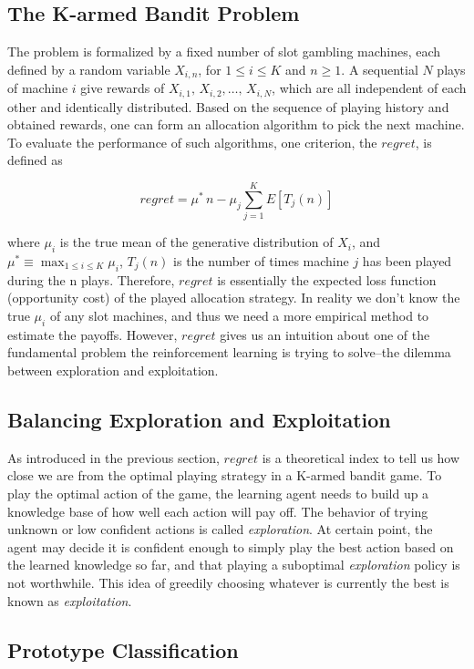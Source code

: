 \documentclass[conference]{IEEEtran}
\begin{document}
\subsection{The K-armed Bandit Problem}
The problem is formalized by a fixed number of slot gambling machines, each defined by a random variable $X_{i,n}$, for $1\leq i \leq K$ and $n \geq 1$. A sequential $N$ plays of machine $i$ give rewards of $X_{i,1},\,X_{i,2},\dots,\, X_{i,N}$, which are all independent of each other and identically distributed. Based on the sequence of playing history and obtained rewards, one can form an allocation algorithm to pick the next machine. To evaluate the performance of such algorithms, one criterion, the $regret$, is defined as

\begin{equation*}
	regret = \mu^{*}\,n - \mu_j \sum_{j=1}^K E[T_j(n)]
\end{equation*}

\noindent where $\mu_i$ is the true mean of the generative distribution of $X_i$, and $\mu^{*} \equiv \max_{1\leq i \leq K} \mu_i$, $T_j(n)$ is the number of times machine $j$ has been played during the n plays. Therefore, $regret$ is essentially the expected loss function (opportunity cost) of the played allocation strategy. In reality we don't know the true $\mu_i$ of any slot machines, and thus we need a more empirical method to estimate the payoffs. However, $regret$ gives us an intuition about one of the fundamental problem the reinforcement learning is trying to solve--the dilemma between exploration and exploitation.

\subsection{Balancing Exploration and Exploitation}
As introduced in the previous section, $regret$ is a theoretical index to tell us how close we are from the optimal playing strategy in a K-armed bandit game. To play the optimal action of the game, the learning agent needs to build up a knowledge base of how well each action will pay off. The behavior of trying unknown or low confident actions is called \emph{exploration}. At certain point, the agent may decide it is confident enough to simply play the best action based on the learned knowledge so far, and that playing a suboptimal \emph{exploration} policy is not worthwhile. This idea of greedily choosing whatever is currently the best  is known as \emph{exploitation}.

\subsection{Prototype Classification}
\end{document}
